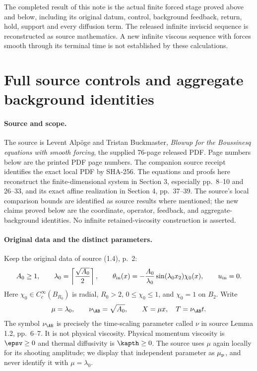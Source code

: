 The completed result of this note is the actual finite forced
stage proved above and below, including its original datum,
control, background feedback, return, hold, support and every
diffusion term. The released infinite inviscid sequence is
reconstructed as source mathematics. A new infinite viscous
sequence with forces smooth through its terminal time is not
established by these calculations.




\section{Full source controls and aggregate background identities}
\paragraph{Source and scope.}
The source is Levent Alp\"oge and Tristan Buckmaster, \emph{Blowup for the Boussinesq equations with smooth forcing}, the supplied 76-page released PDF. Page numbers below are the printed PDF page numbers. The companion source receipt identifies the exact local PDF by SHA-256. The equations and proofs here reconstruct the finite-dimensional system in Section 3, especially pp.~8--10 and 26--33, and its exact affine realization in Section 4, pp.~37--39. The source's local comparison bounds are identified as source results where mentioned; the new claims proved below are the coordinate, operator, feedback, and aggregate-background identities. No infinite retained-viscosity construction is asserted.

\paragraph{Original data and the distinct parameters.}
Keep the original data of source (1.4), p.~2:
\[
 A_0\ge1,\qquad \lambda_0=\left\lceil\frac{\sqrt{A_0}}2\right\rceil,
 \qquad \theta_{\rm in}(x)=-\frac{A_0}{\lambda_0}\sin(\lambda_0x_2)\chi_0(x),
 \qquad u_{\rm in}=0.
\]
Here $\chi_0\in C_c^\infty(B_{R_0})$ is radial, $R_0>2$, $0\le\chi_0\le1$, and $\chi_0=1$ on $B_2$. Write
\[
 \mu=\lambda_0,\qquad \nu_{\AB}=\sqrt{A_0},\qquad X=\mu x,\quad T=\nu_{\AB}t.
\]
The symbol $\nu_{\AB}$ is precisely the time-scaling parameter called $\nu$ in source Lemma 1.2, pp.~6--7. It is not physical viscosity. Physical momentum viscosity is $\epsv\ge0$ and thermal diffusivity is $\kapth\ge0$. The source uses $\mu$ again locally for its shooting amplitude; we display that independent parameter as $\mu_{\rm p}$, and never identify it with $\mu=\lambda_0$.

